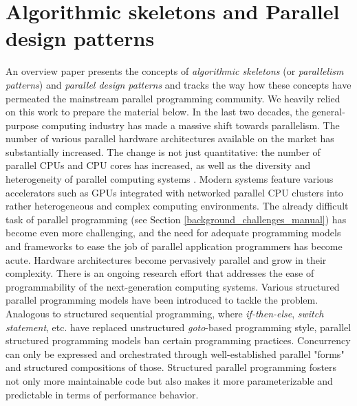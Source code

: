\section{Algorithmic skeletons and Parallel design patterns}
\label{background_skeletons}
\quad An overview paper \cite{skeletons-overview} presents the concepts of \textit{algorithmic skeletons} (or \textit{parallelism patterns}) and \textit{parallel design patterns} and tracks the way how these concepts have permeated the mainstream parallel programming community. We heavily relied on this work to prepare the material below.\newline\null
\quad In the last two decades, the general-purpose computing industry has made a massive shift towards parallelism. The number of various parallel hardware architectures available on the market has substantially increased. The change is not just quantitative: the number of parallel CPUs and CPU cores has increased, as well as the diversity and heterogeneity of parallel computing systems \cite{welcome-to-the-jungle}. Modern systems feature various accelerators such as GPUs integrated with networked parallel CPU clusters into rather heterogeneous and complex computing environments.\newline\null
\quad The already difficult task of parallel programming (see Section \ref{background_challenges_manual}) has become even more challenging, and the need for adequate programming models and frameworks to ease the job of parallel application programmers has become acute. Hardware architectures become pervasively parallel and grow in their complexity. There is an ongoing research effort that addresses the ease of programmability of the next-generation computing systems. Various structured parallel programming models have been introduced to tackle the problem.\newline\null
\quad Analogous to structured sequential programming, where \textit{if-then-else}, \textit{switch statement}, etc. have replaced unstructured \textit{goto}-based programming style, parallel structured programming models ban certain programming practices. Concurrency can only be expressed and orchestrated through well-established parallel "forms" and structured compositions of those. Structured parallel programming fosters not only more maintainable code but also makes it more parameterizable and predictable in terms of performance behavior.\newline\null
